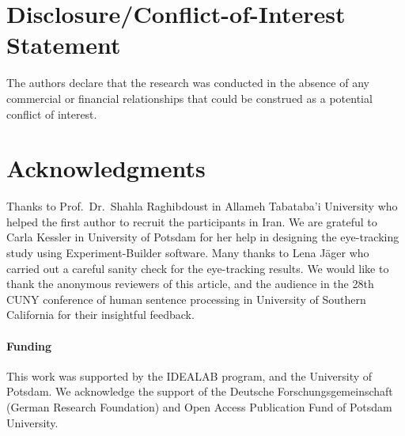 \documentclass{frontiersSCNS}\usepackage{knitr} %
\begin{document}
\section*{Disclosure/Conflict-of-Interest Statement}
The authors declare that the research was conducted in the absence of any
commercial or financial relationships that could be construed as a potential
conflict of interest.

\section*{Acknowledgments}
Thanks to Prof.\ Dr.\ Shahla Raghibdoust in Allameh Tabataba'i University who helped the first author to recruit the participants in Iran. We are grateful to Carla Kessler in University of Potsdam for her help in designing the eye-tracking study using Experiment-Builder software. Many thanks to Lena J\"ager who carried out a careful sanity check for the eye-tracking results. We would like to thank the anonymous reviewers of this article, and the audience in the 28th CUNY conference of human sentence processing in University of Southern California for their insightful feedback. 

\paragraph{Funding\textcolon} This work was supported by the IDEALAB program, and the University of Potsdam.
We acknowledge the support of the Deutsche Forschungsgemeinschaft (German Research Foundation) and Open Access Publication Fund of Potsdam University.

 

\end{document}
